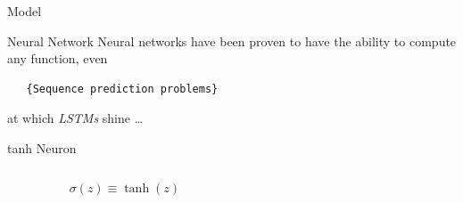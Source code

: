 \documentclass[10pt]{beamer}
\begin{document}
{
\begin{frame}[fragile]{Model}
 \par
\end{frame}
}

\begin{frame}[fragile]{Neural Network}
  Neural networks have been proven to have the ability to compute any function, even

  \begin{verbatim}   {Sequence prediction problems}\end{verbatim}

  at which \emph{LSTMs} shine \ldots
\end{frame}

\begin{frame}[fragile]{tanh Neuron}
\begin{columns}
    \begin{column}{.3\textwidth}
       \begin{equation*}   
  		 \sigma (z) \equiv  \tanh(z)
 		 \end{equation*}
    \end{column}
    \begin{column}{.6\textwidth}

		 \begin{figure}
\end{figure}

	  \end{column}
\end{columns}

\end{frame}
\end{document}
